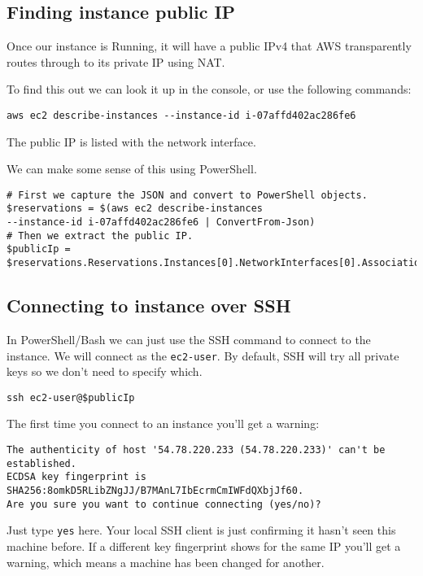 \documentclass{pgnotes}
\begin{document}
\subsection{Finding instance public IP}
\label{sec:finding-instance-public-ip}

Once our instance is Running, it will have a public IPv4 that AWS transparently routes through to its private IP using NAT.

To find this out we can look it up in the console, or use the following commands:
\begin{verbatim}
aws ec2 describe-instances --instance-id i-07affd402ac286fe6
\end{verbatim}
The public IP is listed with the network interface.

We can make some sense of this using PowerShell.

\begin{verbatim}
# First we capture the JSON and convert to PowerShell objects.
$reservations = $(aws ec2 describe-instances 
--instance-id i-07affd402ac286fe6 | ConvertFrom-Json)
# Then we extract the public IP.
$publicIp = $reservations.Reservations.Instances[0].NetworkInterfaces[0].Association.publicIp
\end{verbatim}

\subsection{Connecting to instance over SSH}
\label{sec:connecting-to-instance-over-ssh}

In PowerShell/Bash we can just use the SSH command to connect to the instance.
We will connect as the \texttt{ec2-user}.
By default, SSH will try all private keys so we don't need to specify which.

\begin{verbatim}
ssh ec2-user@$publicIp 
\end{verbatim}

The first time you connect to an instance you'll get a warning:

\begin{verbatim}
The authenticity of host '54.78.220.233 (54.78.220.233)' can't be established.
ECDSA key fingerprint is SHA256:8omkD5RLibZNgJJ/B7MAnL7IbEcrmCmIWFdQXbjJf60.
Are you sure you want to continue connecting (yes/no)?
\end{verbatim}

Just type \texttt{yes} here.
Your local SSH client is just confirming it hasn't seen this machine before.
If a different key fingerprint shows for the same IP you'll get a warning, which means a machine has been changed for another.
\end{document}
